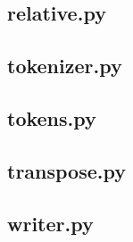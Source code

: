 \documentclass[uplatex,a4paper,11pt]{jsarticle}
\begin{document}
\subsection{relative.py}


\subsection{tokenizer.py}


\subsection{tokens.py}


\subsection{transpose.py}


\subsection{writer.py}

\end{document}
